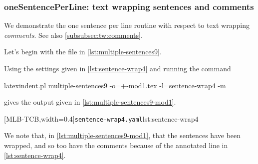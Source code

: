 \documentclass[10pt]{article}
\begin{document}
\subsubsection{oneSentencePerLine: text wrapping sentences and comments}\label{subsubsec:ospl:tw:comments}
 We demonstrate the one sentence per line routine with respect to text wrapping
 \emph{comments}. See also \cref{subsubsec:tw:comments}. 
   

 \begin{example}
 Let's begin with the file in \cref{lst:multiple-sentences9}.


 Using the settings given in \cref{lst:sentence-wrap4} and running the command

 \begin{commandshell}
latexindent.pl multiple-sentences9 -o=+-mod1.tex -l=sentence-wrap4 -m
   \end{commandshell}

 gives the output given in \cref{lst:multiple-sentences9-mod1}.

 \begin{cmhtcbraster}[raster columns=2,
   raster left skip=-1.5cm,
   raster right skip=-0cm,
   raster column skip=.06\linewidth]
  [MLB-TCB,width=0.4\linewidth]{\texttt{sentence-wrap4.yaml}}{lst:sentence-wrap4}
 \end{cmhtcbraster}

 We note that, in \cref{lst:multiple-sentences9-mod1}, that the sentences have been
 wrapped, and so too have the comments because of the annotated line in
 \cref{lst:sentence-wrap4}.
 \end{example}
\end{document}
